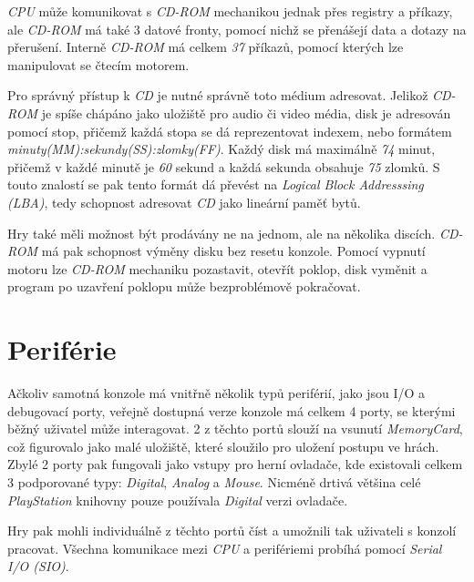 \textit{CPU} může komunikovat s \textit{CD-ROM} mechanikou jednak přes registry a příkazy, ale \textit{CD-ROM} má také 3 datové fronty,
pomocí nichž se přenášejí data a dotazy na přerušení. Interně \textit{CD-ROM} má celkem \textit{37} příkazů, pomocí kterých
lze manipulovat se čtecím motorem.

Pro správný přístup k \textit{CD} je nutné správně toto médium adresovat. Jelikož \textit{CD-ROM} je spíše chápáno jako
uložiště pro audio či video média, disk je adresován pomocí stop, přičemž každá stopa se dá reprezentovat indexem,
nebo formátem \textit{minuty(MM):sekundy(SS):zlomky(FF)}. Každý disk má maximálně \textit{74} minut, přičemž v každé minutě
je \textit{60} sekund a každá sekunda obsahuje \textit{75} zlomků. S touto znalostí se pak tento 
formát dá převést na \textit{Logical Block Addresssing (LBA)}, tedy schopnost adresovat \textit{CD} jako lineární paměť bytů.

Hry také měli možnost být prodávány ne na jednom, ale na několika discích. \textit{CD-ROM} má pak schopnost výměny disku
bez resetu konzole. Pomocí vypnutí motoru lze \textit{CD-ROM} mechaniku pozastavit, otevřít poklop, disk vyměnit
a program po uzavření poklopu může bezproblémově pokračovat.

\section{Periférie}

Ačkoliv samotná konzole má vnitřně několik typů periférií, jako jsou I/O a debugovací porty, veřejně dostupná verze konzole má celkem 4 porty,
se kterými běžný uživatel může interagovat. 2 z těchto portů slouží na vsunutí \textit{MemoryCard}, což figurovalo jako malé uložiště, které sloužilo
pro uložení postupu ve hrách. Zbylé 2 porty pak fungovali jako vstupy pro herní ovladače, kde existovali celkem 3 podporované typy: \textit{Digital}, \textit{Analog} a \textit{Mouse}.
Nicméně drtivá většina celé \textit{PlayStation} knihovny pouze používala \textit{Digital} verzi ovladače.

Hry pak mohli individuálně z těchto portů číst a umožnili tak uživateli s konzolí pracovat.
Všechna komunikace mezi \textit{CPU} a perifériemi probíhá pomocí \textit{Serial I/O (SIO)}.













